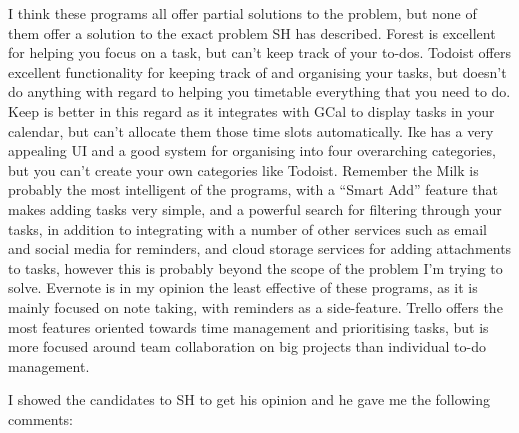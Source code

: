 \documentclass{article}
\begin{document}
I think these programs all offer partial solutions to the problem, but none of
them offer a solution to the exact problem SH has described. Forest is excellent
for helping you focus on a task, but can't keep track of your to-dos. Todoist
offers excellent functionality for keeping track of and organising your tasks,
but doesn't do anything with regard to helping you timetable everything that you
need to do. Keep is better in this regard as it integrates with GCal to display
tasks in your calendar, but can't allocate them those time slots automatically.
Ike has a very appealing UI and a good system for organising into four
overarching categories, but you can't create your own categories like Todoist.
Remember the Milk is probably the most intelligent of the programs, with a
``Smart Add'' feature that makes adding tasks very simple, and a powerful search
for filtering through your tasks, in addition to integrating with a number of
other services such as email and social media for reminders, and cloud storage
services for adding attachments to tasks, however this is probably beyond the
scope of the problem I'm trying to solve. Evernote is in my opinion the least
effective of these programs, as it is mainly focused on note taking, with
reminders as a side-feature. Trello offers the most features oriented towards
time management and prioritising tasks, but is more focused around team
collaboration on big projects than individual to-do management.

I showed the candidates to SH to get his opinion and he gave me the following
comments:
\end{document}
